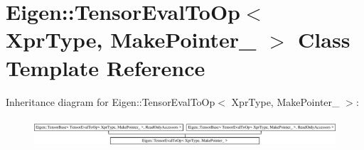 \hypertarget{class_eigen_1_1_tensor_eval_to_op}{}\section{Eigen\+:\+:Tensor\+Eval\+To\+Op$<$ Xpr\+Type, Make\+Pointer\+\_\+ $>$ Class Template Reference}
\label{class_eigen_1_1_tensor_eval_to_op}
Inheritance diagram for Eigen\+:\+:Tensor\+Eval\+To\+Op$<$ Xpr\+Type, Make\+Pointer\+\_\+ $>$\+:\begin{figure}[H]
\begin{center}
\leavevmode
\includegraphics[height=1.058601cm]{class_eigen_1_1_tensor_eval_to_op}
\end{center}
\end{figure}
